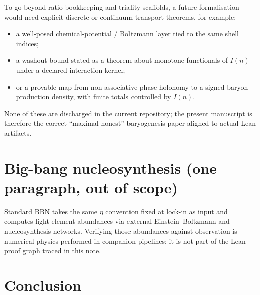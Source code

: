 \documentclass[11pt]{amsart}
\begin{document}
To go beyond ratio bookkeeping and triality scaffolds, a future formalisation would need explicit discrete or continuum transport theorems, for example:
\begin{itemize}
\item a well-posed chemical-potential / Boltzmann layer tied to the same shell indices;
\item a washout bound stated as a theorem about monotone functionals of \(I(n)\) under a declared interaction kernel;
\item or a provable map from non-associative phase holonomy to a signed baryon production density, with finite totals controlled by \(I(n)\).
\end{itemize}
None of these are discharged in the current repository; the present manuscript is therefore the correct ``maximal honest'' baryogenesis paper aligned to actual Lean artifacts.

\section*{Big-bang nucleosynthesis (one paragraph, out of scope)}

Standard BBN takes the same \(\eta\) convention fixed at lock-in as input and computes light-element abundances via external Einstein--Boltzmann and nucleosynthesis networks.
Verifying those abundances against observation is numerical physics performed in companion pipelines; it is not part of the Lean proof graph traced in this note.

\section{Conclusion}
\end{document}
